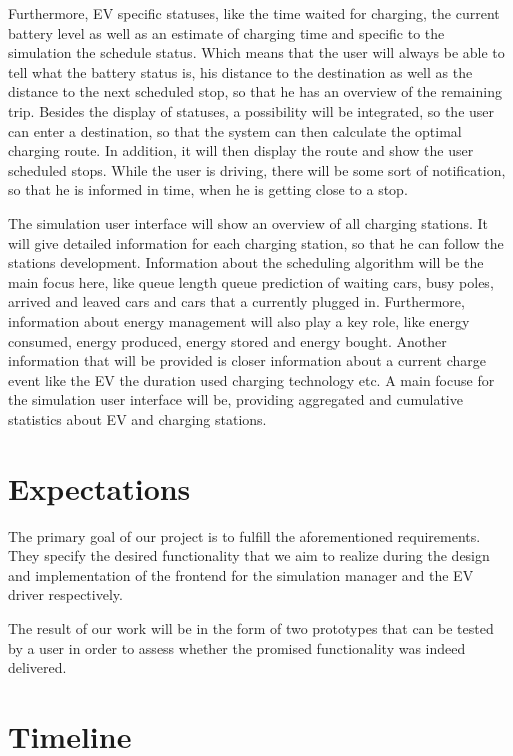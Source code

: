 \documentclass[hidelinks]{sig-alternate}
\begin{document}
Furthermore, EV specific statuses, like the time waited for charging, the current battery level as well as an
estimate of charging time and specific to the simulation the schedule status. Which means that the user will always
be able to tell what the battery status is, his distance to the destination as well as the distance to the next
scheduled stop, so that he has an overview of the remaining trip. Besides the display of statuses, a possibility
will be integrated, so the user can enter a destination, so that the system can then calculate the optimal charging
route. In addition, it will then display the route and show the user scheduled stops. While the user is driving,
there will be some sort of notification, so that he is informed in time, when he is getting close to a stop.

The simulation user interface will show an overview of all charging stations. It will give detailed information for
each charging station, so that he can follow the stations development. Information about the scheduling algorithm
will be the main focus here, like queue length queue prediction of waiting cars, busy poles, arrived and leaved cars
and cars that a currently plugged in. Furthermore, information about energy management will also play a key role,
like energy consumed, energy produced, energy stored and energy bought. Another information that will be provided is
closer information about a current charge event like the EV the duration used charging technology etc. A main focuse
for the simulation user interface will be, providing aggregated and cumulative statistics about EV and charging
stations.


\section{Expectations}

The primary goal of our project is to fulfill the aforementioned requirements. They specify the desired functionality
that we aim to realize during the design and implementation of the frontend for the simulation manager and the EV
driver respectively.

The result of our work will be in the form of two prototypes that can be tested by a user in order to assess whether
the promised functionality was indeed delivered.


\section{Timeline}
\end{document}

